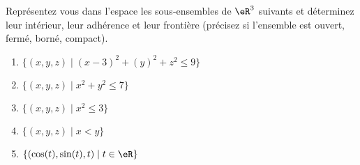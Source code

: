 
\begin{exercice}\label{exo0077}

 Représentez vous dans l'espace les sous-ensembles de $\eR^3$ suivants et déterminez leur intérieur, leur adhérence et leur frontière (précisez si l'ensemble est ouvert, fermé, borné, compact).
\begin{enumerate}
\item $ \{ (x,y,z) \mid (x-3)^2 +(y)^2 + z^2 \leq 9 \} $
\item $ \{ (x,y,z) \mid x^2 + y^2 \leq 7 \} $
\item\label{Item0077c} $ \{ (x,y,z) \mid x^2 \leq 3 \} $
\item $ \{ (x,y,z) \mid x < y \} $
\item $ \{ (\cos(t),\sin(t),t) \mid t \in \eR \} $
\end{enumerate}
\end{exercice}
